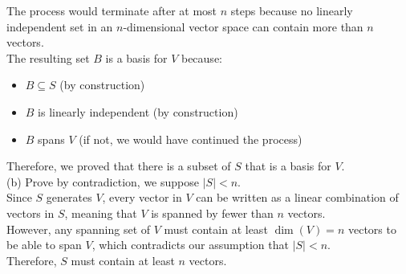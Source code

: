 \documentclass{article}
\begin{document}
The process would terminate after at most $n$ steps because no linearly independent set in an $n$-dimensional vector space can contain more than $n$ vectors. \\

The resulting set $B$ is a basis for $V$ because:
\begin{itemize}
    \item $B \subseteq S$ (by construction)
    \item $B$ is linearly independent (by construction)
    \item $B$ spans $V$ (if not, we would have continued the process)
\end{itemize}

Therefore, we proved that there is a subset of $S$ that is a basis for $V$. \\

(b) Prove by contradiction, we suppose $|S| < n$. \\

Since $S$ generates $V$, every vector in $V$ can be written as a linear combination of vectors in $S$, meaning that $V$ is spanned by fewer than $n$ vectors. \\

However, any spanning set of $V$ must contain at least $\dim(V) = n$ vectors to be able to span $V$, which contradicts our assumption that $|S| < n$. \\

Therefore, $S$ must contain at least $n$ vectors. 
\end{document}
